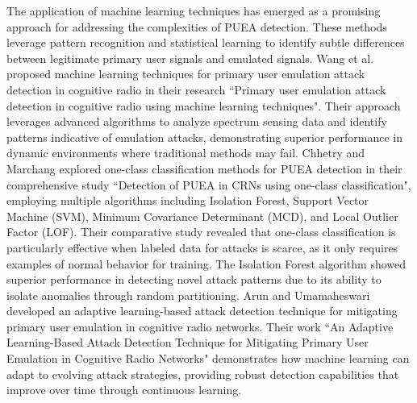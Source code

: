 The application of machine learning techniques has emerged as a promising approach for addressing the complexities of PUEA detection. These methods leverage pattern recognition and statistical learning to identify subtle differences between legitimate primary user signals and emulated signals.
Wang et al. \cite{ref9} proposed machine learning techniques for primary user emulation attack detection in cognitive radio in their research ``Primary user emulation attack detection in cognitive radio using machine learning techniques". Their approach leverages advanced algorithms to analyze spectrum sensing data and identify patterns indicative of emulation attacks, demonstrating superior performance in dynamic environments where traditional methods may fail.
Chhetry and Marchang \cite{ref23} explored one-class classification methods for PUEA detection in their comprehensive study ``Detection of PUEA in CRNs using one-class classification", employing multiple algorithms including Isolation Forest, Support Vector Machine (SVM), Minimum Covariance Determinant (MCD), and Local Outlier Factor (LOF). Their comparative study revealed that one-class classification is particularly effective when labeled data for attacks is scarce, as it only requires examples of normal behavior for training. The Isolation Forest algorithm showed superior performance in detecting novel attack patterns due to its ability to isolate anomalies through random partitioning.
Arun and Umamaheswari \cite{ref19} developed an adaptive learning-based attack detection technique for mitigating primary user emulation in cognitive radio networks. Their work ``An Adaptive Learning-Based Attack Detection Technique for Mitigating Primary User Emulation in Cognitive Radio Networks" demonstrates how machine learning can adapt to evolving attack strategies, providing robust detection capabilities that improve over time through continuous learning.


